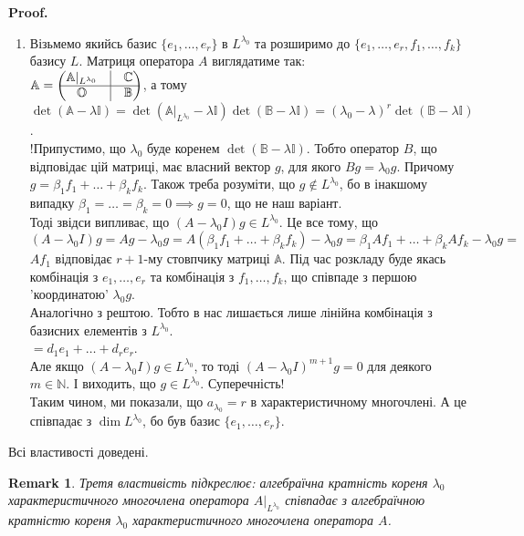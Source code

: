 \documentclass[a4paper, 10pt]{article}
\makeatletter
\theoremstyle{theoremdd}
\newtheorem{remark}[theorem]{Remark}
\renewenvironment{proof}[1][Proof.\\]{\par
\pushQED{\hfill \qed}%
\normalfont \topsep6\p@\@plus6\p@\relax
\trivlist
\item\relax
{\bfseries
#1\@addpunct{.}}\hspace\labelsep\ignorespaces
}{%
\popQED\endtrivlist\@endpefalse
}
\makeatother
\begin{document}
\begin{proof}
\begin{enumerate}[wide=0pt,label={\arabic*)}]
\item Візьмемо якийсь базис $\{e_1,\dots,e_r\}$ в $L^{\lambda_0}$ та розширимо до $\{e_1,\dots,e_r,f_1,\dots,f_k\}$ базису $L$. Матриця оператора $A$ виглядатиме так:\\
$\mathbb{A} = \begin{pmatrix}
 \mathbb{A}|_{L^{\lambda_0}}  & \vline & \mathbb{C} \\
 \hline
 \mathbb{O} & \vline & \mathbb{B}
\end{pmatrix}$, а тому $\det (\mathbb{A}-\lambda \mathbb{I}) = \det (\mathbb{A}|_{L^{\lambda_0}}-\lambda \mathbb{I}) \det (\mathbb{B} - \lambda \mathbb{I}) = (\lambda_0 - \lambda)^r \det (\mathbb{B} - \lambda \mathbb{I})$.\\
!Припустимо, що $\lambda_0$ буде коренем $\det (\mathbb{B}-\lambda \mathbb{I})$. Тобто оператор $B$, що відповідає цій матриці, має власний вектор $g$, для якого $Bg = \lambda_0 g$. Причому $g = \beta_1 f_1 + \dots + \beta_k f_k$. Також треба розуміти, що $g \notin L^{\lambda_0}$, бо в інакшому випадку $\beta_1=\dots=\beta_k = 0 \implies g = 0$, що не наш варіант.\\
Тоді звідси випливає, що $(A-\lambda_0 I)g \in L^{\lambda_0}$. Це все тому, що\\
$(A-\lambda_0 I)g = Ag - \lambda_0 g = A(\beta_1 f_1 + \dots + \beta_k f_k) - \lambda_0 g = \beta_1 A f_1 + \dots + \beta_k A f_k - \lambda_0 g \boxed{=}$\\
$Af_1$ відповідає $r+1$-му стовпчику матриці $\mathbb{A}$. Під час розкладу буде якась комбінація з $e_1,\dots,e_r$ та комбінація з $f_1,\dots,f_k$, що співпаде з першою 'координатою' $\lambda_0 g$.\\
Аналогічно з рештою. Тобто в нас лишається лише лінійна комбінація з базисних елементів з $L^{\lambda_0}$.\\
$\boxed{=} d_1 e_1 + \dots + d_r e_r$.\\
Але якщо $(A-\lambda_0 I)g \in L^{\lambda_0}$, то тоді $(A-\lambda_0 I)^{m+1} g = 0$ для деякого $m \in \mathbb{N}$. І виходить, що $g \in L^{\lambda_0}$. Суперечність!\\
Таким чином, ми показали, що $a_{\lambda_0} = r$ в характеристичному многочлені. А це співпадає з $\dim L^{\lambda_0}$, бо був базис $\{e_1,\dots,e_r\}$.
\end{enumerate}
Всі властивості доведені.
\end{proof}

\begin{remark}
Третя властивість підкреслює: алгебраїчна кратність кореня $\lambda_0$ характеристичного многочлена оператора $A|_{L^{\lambda_0}}$ співпадає з алгебраїчною кратністю кореня $\lambda_0$ характеристичного многочлена оператора $A$.
\end{remark}
\end{document}
